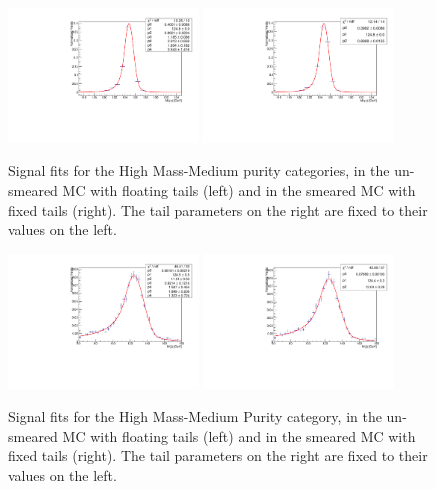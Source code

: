  
\begin{figure}[h]
  \centering
  \includegraphics[width=0.45\textwidth]{figures/sec-systematics/mggHMMPC_floating_central.pdf}\hfil
  \includegraphics[width=0.45\textwidth]{figures/sec-systematics/mggHMMPC_fixed_up.pdf}\hfil
  \caption{Signal fits for the High Mass-Medium purity categories, in the un-smeared MC with floating tails (left) and in the smeared MC with fixed tails (right). The tail parameters on the right are fixed to their values on the left.}
  \label{fig:mgg_smear}
\end{figure}

\begin{figure}[h]
  \centering
  \includegraphics[width=0.45\textwidth]{figures/sec-systematics/mjjHMMPC_floating_central.pdf}\hfil
  \includegraphics[width=0.45\textwidth]{figures/sec-systematics/mjjHMMPC_fixed_up.pdf}\hfil
  \caption{Signal fits for the High Mass-Medium Purity category, in the un-smeared MC with floating tails (left) and in the smeared MC with fixed tails (right). The tail parameters on the right are fixed to their values on the left.}
  \label{fig:mjj_smear}
\end{figure}

